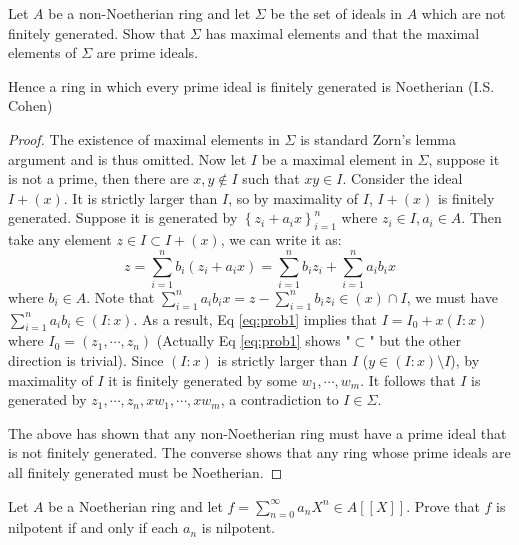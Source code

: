 \documentclass{solution}
\begin{document}
\begin{problem}
    Let $A$ be a non-Noetherian ring and let $\Sigma$ be the set of ideals in $A$ which are not finitely generated. Show that $\Sigma$ has maximal elements and that the maximal elements of $\Sigma$ are prime ideals.

    Hence a ring in which every prime ideal is finitely generated is Noetherian (I.S. Cohen)
\end{problem}

\begin{proof}
    The existence of maximal elements in $\Sigma$ is standard Zorn's lemma argument and is thus omitted. Now let $I$ be a maximal element in $\Sigma$, suppose it is not a prime, then there are $x, y \notin I$ such that $xy \in I$. Consider the ideal $I + (x)$. It is strictly larger than $I$, so by maximality of $I$, $I + (x)$ is finitely generated. Suppose it is generated by $\left\lbrace z_i + a_ix \right\rbrace_{i = 1}^n$ where $z_i \in I, a_i \in A$. Then take any element $z \in I \subset I + (x)$, we can write it as:
    \begin{equation}\label{eq:prob1}
        z = \sum\limits_{i = 1}^{n} b_i(z_i + a_ix) = \sum\limits_{i = 1}^{n} b_iz_i + \sum\limits_{i = 1}^{n} a_ib_ix
    \end{equation}
    where $b_i \in A$. Note that $\sum\limits_{i = 1}^{n} a_ib_i x = z - \sum\limits_{i = 1}^{n} b_i z_i \in (x) \cap I$, we must have $\sum\limits_{i = 1}^{n} a_ib_i \in (I : x)$. As a result, Eq \ref{eq:prob1} implies that $I = I_0 + x(I : x)$ where $I_0 = (z_1, \cdots, z_n)$ (Actually Eq \ref{eq:prob1} shows "$\subset$" but the other direction is trivial). Since $(I : x)$ is strictly larger than $I$ ($y \in (I : x) \setminus I$), by maximality of $I$ it is finitely generated by some $w_1, \cdots, w_m$. It follows that $I$ is generated by $z_1, \cdots, z_n, xw_1, \cdots, xw_m$, a contradiction to $I \in \Sigma$.

    The above has shown that any non-Noetherian ring must have a prime ideal that is not finitely generated. The converse shows that any ring whose prime ideals are all finitely generated must be Noetherian.
\end{proof}

\begin{problem}
    Let $A$ be a Noetherian ring and let $f = \sum\limits_{n = 0}^{\infty} a_n X^n \in A[[X]]$. Prove that $f$ is nilpotent if and only if each $a_n$ is nilpotent.
\end{problem}
\end{document}

